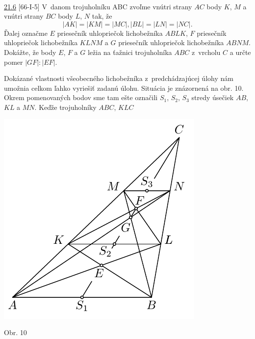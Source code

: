 \\
\begin{tcolorbox}[breakable,notitle,boxrule=0pt,colback=light-gray,colframe=light-gray]\ul{21.6} [66-I-5] V~danom trojuholníku ABC zvoľme vnútri strany $AC$ body $K$, $M$ a vnútri strany $BC$ body $L$, $N$ tak, že
$$|AK| = |KM| = |MC|, |BL| = |LN| = |NC|.$$
Ďalej označme $E$ priesečník uhlopriečok lichobežníka $ABLK$, $F$ priesečník uhlopriečok lichobežníka $KLNM$ a $G$ priesečník uhlopriečok lichobežníka $ABNM$. Dokážte, že body $E$, $F$ a $G$ ležia na ťažnici trojuholníka $ABC$ z~vrcholu $C$ a určte pomer $|GF| : |EF|$.

\end{tcolorbox}

\rieh
Dokázané vlastnosti všeobecného lichobežníka z~predchádzajúcej úlohy nám umožnia celkom ľahko vyriešiť zadanú úlohu. Situácia je znázornená na obr. 10. Okrem pomenovaných bodov sme tam ešte označili $S_1$, $S_2$, $S_3$ stredy úsečiek $AB$, $KL$ a $MN$. Keďže trojuholníky $ABC$, $KLC$
\begin{center}
\includegraphics{obrazky/66D52}

Obr. 10
\end{center}
